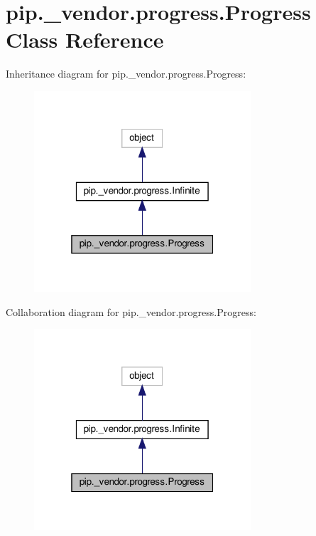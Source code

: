 \hypertarget{classpip_1_1__vendor_1_1progress_1_1Progress}{}\section{pip.\+\_\+vendor.\+progress.\+Progress Class Reference}
\label{classpip_1_1__vendor_1_1progress_1_1Progress}


Inheritance diagram for pip.\+\_\+vendor.\+progress.\+Progress\+:
\nopagebreak
\begin{figure}[H]
\begin{center}
\leavevmode
\includegraphics[width=229pt]{classpip_1_1__vendor_1_1progress_1_1Progress__inherit__graph}
\end{center}
\end{figure}


Collaboration diagram for pip.\+\_\+vendor.\+progress.\+Progress\+:
\nopagebreak
\begin{figure}[H]
\begin{center}
\leavevmode
\includegraphics[width=229pt]{classpip_1_1__vendor_1_1progress_1_1Progress__coll__graph}
\end{center}
\end{figure}
